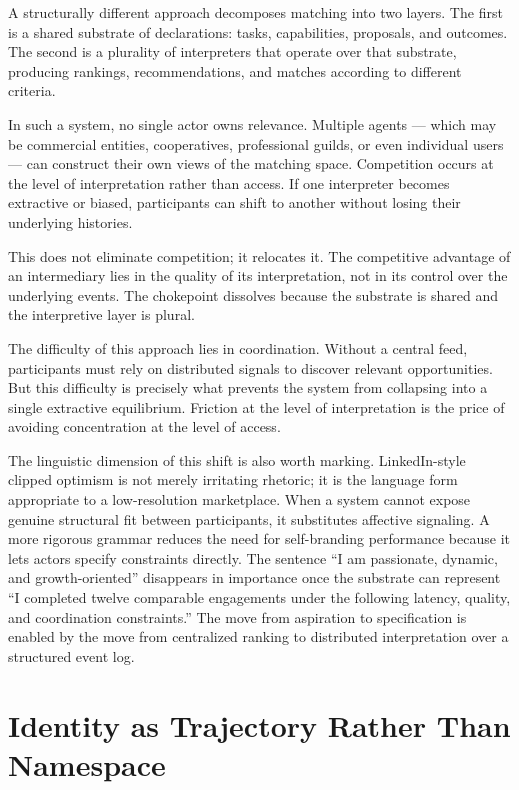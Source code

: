 \documentclass[12pt, a4paper]{article}
\begin{document}
A structurally different approach decomposes matching into two layers. The
first is a shared substrate of declarations: tasks, capabilities, proposals,
and outcomes. The second is a plurality of interpreters that operate over that
substrate, producing rankings, recommendations, and matches according to
different criteria.

In such a system, no single actor owns relevance. Multiple agents --- which may
be commercial entities, cooperatives, professional guilds, or even individual
users --- can construct their own views of the matching space. Competition
occurs at the level of interpretation rather than access. If one interpreter
becomes extractive or biased, participants can shift to another without losing
their underlying histories.

This does not eliminate competition; it relocates it. The competitive advantage
of an intermediary lies in the quality of its interpretation, not in its control
over the underlying events. The chokepoint dissolves because the substrate is
shared and the interpretive layer is plural.

The difficulty of this approach lies in coordination. Without a central feed,
participants must rely on distributed signals to discover relevant
opportunities. But this difficulty is precisely what prevents the system from
collapsing into a single extractive equilibrium. Friction at the level of
interpretation is the price of avoiding concentration at the level of access.

The linguistic dimension of this shift is also worth marking. LinkedIn-style
clipped optimism is not merely irritating rhetoric; it is the language form
appropriate to a low-resolution marketplace. When a system cannot expose
genuine structural fit between participants, it substitutes affective
signaling. A more rigorous grammar reduces the need for self-branding
performance because it lets actors specify constraints directly. The sentence
``I am passionate, dynamic, and growth-oriented'' disappears in importance
once the substrate can represent ``I completed twelve comparable engagements
under the following latency, quality, and coordination constraints.'' The
move from aspiration to specification is enabled by the move from centralized
ranking to distributed interpretation over a structured event log.

\section{Identity as Trajectory Rather Than Namespace}
\end{document}
